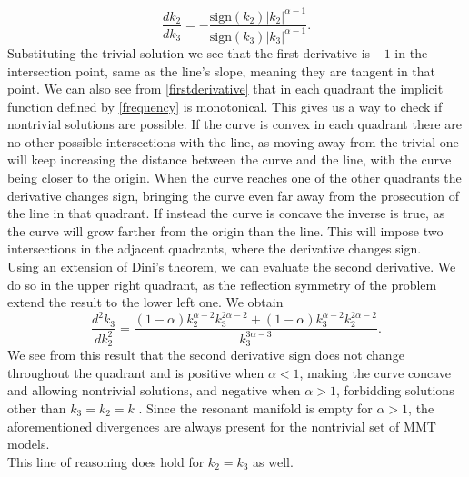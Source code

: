     \begin{equation}
        \frac{d k_2}{dk_3} = -\frac{\text{sign}(k_2)|k_2|^{\alpha-1}}{\text{sign}(k_3)|k_3|^{\alpha-1}}.
        \label{firstderivative}
    \end{equation}
    Substituting the trivial solution we see that the first derivative is $-1$ in the intersection point, same as the line's slope, meaning they are tangent in that point. We can also see from \eqref{firstderivative} that in each quadrant the implicit function defined by \eqref{frequency} is monotonical. This gives us a way to check if nontrivial solutions are possible. If the curve is 
    convex in each quadrant there are no other possible intersections with the line, as moving away from the trivial one will keep increasing the distance between the curve and the line, with the curve being closer to the origin. When the curve reaches one of the other quadrants the derivative changes sign, bringing the curve even far away from the prosecution of the line in that quadrant. If instead the curve is concave the inverse is true, as the curve will grow farther from the origin than the line. This will impose two intersections in the adjacent quadrants, where the derivative changes sign.\\
    Using an extension of Dini's theorem, we can evaluate the second derivative. We do so in the upper right quadrant, as the reflection symmetry of the problem extend the result to the lower left one. We obtain 
    \begin{equation}
        \frac{d^2k_3}{dk_2^2} = \frac{(1-\alpha)k_2^{\alpha-2}k_3^{2\alpha-2} + (1-\alpha)k_3^{\alpha-2}k_2^{2\alpha-2}}{k_3^{3\alpha-3}}.
    \end{equation}   
    We see from this result that the second derivative sign does not change throughout the quadrant and is positive when $\alpha < 1 $, making the curve concave and allowing nontrivial solutions, and negative when $\alpha > 1$, forbidding solutions other than $k_3 = k_2 = k$ . Since the resonant manifold is empty for $\alpha>1$, the aforementioned divergences are always present for the nontrivial set of MMT models.\\
    This line of reasoning does hold for $k_2 = k_3$ as well.\\

